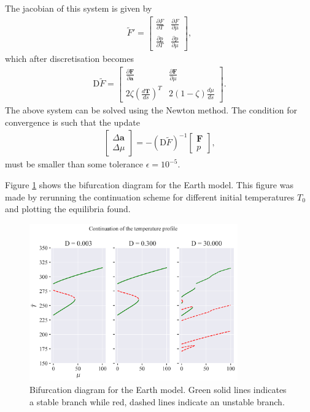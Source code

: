     The jacobian of this system is given by
    \begin{align*}
        \tilde{F}' = 
        \begin{bmatrix}
            \frac{\partial F}{\partial T} & \frac{\partial F}{\partial \mu}\\
            \frac{\partial p}{\partial T} & \frac{\partial p}{\partial \mu}
        \end{bmatrix},
    \end{align*}
    which after discretisation becomes
    \begin{align*}
        \textrm{D}\tilde{F} = 
        \begin{bmatrix}
            \frac{\partial \mathbf{F}}{\partial \mathbf{a}} & \frac{\partial \mathbf{F}}{\partial \mu}\\
            2\zeta\left(\frac{d \mathbf{T}}{ds}\right)^T & 2(1-\zeta)\frac{d \mu}{ds}
        \end{bmatrix}.
    \end{align*}
    The above system can be solved using the Newton method. The condition for convergence is such that the update
    \begin{align*}
        \begin{bmatrix}
            \Delta \mathbf{a}\\
            \Delta \mu
        \end{bmatrix} = -\left(\textrm{D}\tilde{F}\right)^{-1}\begin{bmatrix}
            \mathbf{F}\\
            p
        \end{bmatrix},
    \end{align*}
    must be smaller than some tolerance $\epsilon = 10^{-5}$.
    	
    Figure \ref{fig:bifurcation} shows the bifurcation diagram for the Earth model. This figure was made by rerunning
    the continuation scheme for different initial temperatures $T_0$ and plotting the equilibria found. 
    \begin{figure}[H]
        \centering
        \includegraphics[width=0.8\textwidth]{figures/ebm_continuation.png}
        \caption{Bifurcation diagram for the Earth model. Green solid lines indicates a stable branch
        while red, dashed lines indicate an unstable branch.}
        \label{fig:bifurcation}
    \end{figure}

